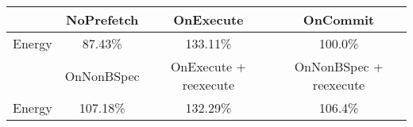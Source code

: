 \begin{tabular}{ l|ccc }
 & NoPrefetch & OnExecute & OnCommit\\ \hline
Energy
 & 87.43\% & 133.11\% & 100.0\%\\ \hline
\hline
 & OnNonBSpec & OnExecute + reexecute & OnNonBSpec + reexecute\\ \hline
Energy
 & 107.18\% & 132.29\% & 106.4\%\\ \hline
\end{tabular}

